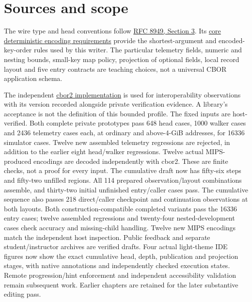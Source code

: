 \clearpage
\section{Sources and scope}
The wire type and head conventions follow
\href{https://www.rfc-editor.org/rfc/rfc8949.html#section-3}{RFC 8949, Section 3}.
Its \href{https://www.rfc-editor.org/rfc/rfc8949.html#section-4.2.1}{core deterministic encoding requirements}
provide the shortest-argument and encoded-key-order rules used by this writer.
The particular telemetry fields, numeric and nesting bounds, small-key map policy,
projection of optional fields, local record layout and five entry contracts are
teaching choices, not a universal CBOR application schema.

The independent \href{https://cbor2.readthedocs.io/en/latest/}{cbor2 implementation}
is used for interoperability observations with its version recorded alongside private
verification evidence. A library's acceptance is not the definition of this bounded
profile. The fixed inputs are host-verified. Both complete private prototypes pass 648
head cases, 1000 walker cases and 2436 telemetry cases each, at ordinary and above-4-GiB
addresses, for 16336 simulator cases. Twelve new assembled telemetry regressions are
rejected, in addition to the earlier eight head/walker regressions. Twelve actual
MIPS-produced encodings are decoded independently with cbor2. These are finite checks,
not a proof for every input. The cumulative draft now has fifty-six steps and fifty-two unfilled regions. All 114
prepared observation/layout combinations assemble, and thirty-two initial unfinished
entry/caller cases pass. The cumulative sequence also passes 218 direct/caller checkpoint and continuation
observations at both layouts. Both construction-compatible completed variants pass the
16336 entry cases; twelve assembled regressions and twenty-four nested-development
cases check accuracy and missing-child handling. Twelve new MIPS encodings match the
independent host inspection. Public feedback and separate student/instructor archives are verified drafts. Four actual light-theme IDE figures now show the exact cumulative head, depth,
publication and projection stages, with native annotations and independently checked
execution states. Remote progression/hint enforcement and independent accessibility
validation remain subsequent work. Earlier chapters are retained
for the later substantive editing pass.
